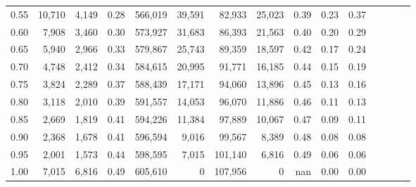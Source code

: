 \begin{tabular}{rrrcrrrrrrrrrrr}
0.55 &  10,710 &   4,149 &                                       0.28 &  566,019 &   39,591 &   82,933 &   25,023 &  0.39 &  0.23 &                         0.37 \\
0.60 &   7,908 &   3,460 &                                       0.30 &  573,927 &   31,683 &   86,393 &   21,563 &  0.40 &  0.20 &                         0.29 \\
0.65 &   5,940 &   2,966 &                                       0.33 &  579,867 &   25,743 &   89,359 &   18,597 &  0.42 &  0.17 &                         0.24 \\
0.70 &   4,748 &   2,412 &                                       0.34 &  584,615 &   20,995 &   91,771 &   16,185 &  0.44 &  0.15 &                         0.19 \\
0.75 &   3,824 &   2,289 &                                       0.37 &  588,439 &   17,171 &   94,060 &   13,896 &  0.45 &  0.13 &                         0.16 \\
0.80 &   3,118 &   2,010 &                                       0.39 &  591,557 &   14,053 &   96,070 &   11,886 &  0.46 &  0.11 &                         0.13 \\
0.85 &   2,669 &   1,819 &                                       0.41 &  594,226 &   11,384 &   97,889 &   10,067 &  0.47 &  0.09 &                         0.11 \\
0.90 &   2,368 &   1,678 &                                       0.41 &  596,594 &    9,016 &   99,567 &    8,389 &  0.48 &  0.08 &                         0.08 \\
0.95 &   2,001 &   1,573 &                                       0.44 &  598,595 &    7,015 &  101,140 &    6,816 &  0.49 &  0.06 &                         0.06 \\
1.00 &   7,015 &   6,816 &                                       0.49 &  605,610 &        0 &  107,956 &        0 &   nan &  0.00 &                         0.00 \\
\bottomrule
\end{tabular}
